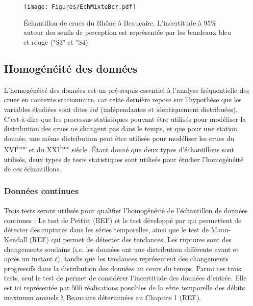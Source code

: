 \documentclass[11pt]{article}
\begin{document}
	\begin{figure}[h]
		\texttt{[image: Figures/EchMixteBcr.pdf]}	
		\caption{Échantillon de crues du Rhône à Beaucaire. L'incertitude à 95\% autour des seuils de perception est représentée par les bandeaux bleu et rouge ("S3" et "S4)}
		\label{fig:EchMixte}
	\end{figure}
	

	\subsection{Homogénéité des données}
	\paragraph{} L'homogénéité des données est un pré-requis essentiel à l'analyse fréquentielle des crues en contexte stationnaire, car cette dernière repose sur l'hypothèse que les variables étudiées sont dites $iid$ (indépendantes et identiquement distribuées). C'est-à-dire que les processus statistiques pouvant être utilisés pour modéliser la distribution des crues ne changent pas dans le temps, et que pour une station donnée, une même distribution peut être utilisée pour modéliser les crues du XVI\textsuperscript{ème} et du XXI\textsuperscript{ème} siècle. Étant donné que deux types d'échantillons sont utilisés, deux types de tests statistiques sont utilisés pour étudier l'homogénéité de ces échantillons. 

	\subsubsection{Données continues}
	
	\paragraph{} Trois tests seront utilisés pour qualifier l'homogénéité de l'échantillon de données continues : Le test de Pettitt (REF) et le test développé par \citep{darienzo_detection_2021-1} qui permettent de détecter des ruptures dans les séries temporelles, ainsi que le test de Mann-Kendall (REF) qui permet de détecter des tendances. Les ruptures sont des changements soudains (i.e. les données ont une distribution différente avant et après un instant $t$), tandis que les tendances représentent des changements progressifs dans la distribution des données au cours du temps. Parmi ces trois tests, seul le test de  \citep{darienzo_detection_2021-1} permet de considérer l'incertitude des données d'entrée. Elle est ici représentée par 500 réalisations possibles de la série temporelle des débits maximum annuels à Beaucaire déterminées au Chapitre 1 (REF).
	
\end{document}
